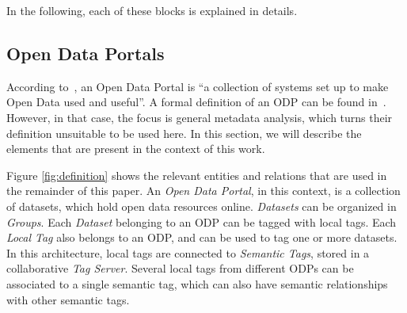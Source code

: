 In the following, each of these blocks is explained in details.

\subsection{Open Data Portals}
\label{sec:definition} 

According to~, an Open Data Portal is ``a collection of systems set up to make Open Data used and useful''.
A formal definition of an ODP can be found in~.
However, in that case, the focus is general metadata analysis, which turns their definition unsuitable to be used here. 
In this section, we will describe the elements that are present in the context of this work.

Figure \ref{fig:definition} shows the relevant entities and relations that are used in the remainder of this paper.
An \emph{Open Data Portal}, in this context, is a collection of datasets, which hold open data resources online.
\emph{Datasets} can be organized in \emph{Groups}.
Each \emph{Dataset} belonging to an ODP can be tagged with local tags. 
Each \emph{Local Tag} also belongs to an ODP, and can be used to tag one or more datasets.
In this architecture, local tags are connected to \emph{Semantic Tags}, stored in a collaborative \emph{Tag Server}.
Several local tags from different ODPs can be associated to a single semantic tag, which can also have semantic relationships with other semantic tags.

